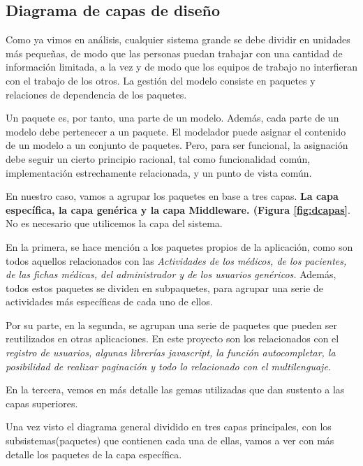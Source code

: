 
	\newpage
	\subsection{Diagrama de capas de diseño} %
	\label{sec:diagrama_de_capas_diseno}

		Como ya vimos en análisis, cualquier sistema grande se debe dividir en unidades más pequeñas, de modo que las personas puedan trabajar con una cantidad de información limitada, a la vez y de modo que los equipos de trabajo no interfieran con el trabajo de los otros. La gestión del modelo consiste en paquetes y relaciones de dependencia de los paquetes.

		Un paquete es, por tanto, una parte de un modelo. Además, cada parte de un modelo debe pertenecer a un paquete. El modelador puede asignar el contenido de un modelo a un conjunto de paquetes. Pero, para ser funcional, la asignación debe seguir un cierto principio racional, tal como funcionalidad común, implementación estrechamente relacionada, y un punto de vista común.

		En nuestro caso, vamos a agrupar los paquetes en base a tres capas. \textbf{La capa específica, la capa genérica y la capa Middleware. (Figura \ref{fig:dcapas}}. No es necesario que utilicemos la capa del sistema.

		En la primera, se hace mención a los paquetes propios de la aplicación, como son todos aquellos relacionados con las \textit{Actividades de los médicos, de los pacientes, de las fichas médicas, del administrador y de los usuarios genéricos.} Además, todos estos paquetes se dividen en subpaquetes, para agrupar una serie de actividades más específicas de cada uno de ellos. 

		Por su parte, en la segunda, se agrupan una serie de paquetes que pueden ser reutilizados en otras aplicaciones. En este proyecto son los relacionados con el \textit{registro de usuarios, algunas librerías javascript, la función autocompletar, la posibilidad de realizar paginación y todo lo relacionado con el multilenguaje.}

		En la tercera, vemos en más detalle las gemas utilizadas que dan sustento a las capas superiores.

		Una vez visto el diagrama general dividido en tres capas principales, con los subsistemas(paquetes) que contienen cada una de ellas, vamos a ver con más detalle los paquetes de la capa específica.

